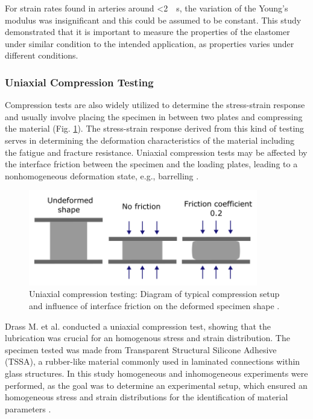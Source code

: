 For strain rates found in arteries around \SI[per-mode = symbol]{<2}{\per \second}, the variation of the
Young's modulus was insignificant and this could be assumed to be constant. This study demonstrated 
that it is important to measure the properties of the elastomer under similar condition to the
intended application, as properties varies under different conditions.

\subsubsection*{Uniaxial Compression Testing}
Compression tests are also widely utilized to determine the stress-strain response and 
usually involve placing the specimen in between two plates and compressing the material (Fig. \ref{fig:compressiondiag}).
The stress-strain response derived from this kind of testing serves in determining the deformation 
characteristics of the material including the fatigue and fracture resistance. 
Uniaxial compression tests may be affected by the interface friction between the specimen and 
the loading plates, leading to a nonhomogeneous deformation state, e.g., barrelling \cite{Bergström2015}.\\

\begin{figure}%
        \centering
       \quad
       \includegraphics[width=10cm]{Images/chapter1/compressiondiag.png}%
       \caption{Uniaxial compression testing: Diagram of typical compression setup and influence of interface friction on the deformed specimen shape \cite{Bergström2015}.}%
       \label{fig:compressiondiag}%
\end{figure}

Drass M. et al. conducted a uniaxial compression test, showing that the lubrication was 
crucial for an homogenous stress and strain distribution. The specimen tested was made from Transparent Structural 
Silicone Adhesive (TSSA), a rubber-like material commonly used in laminated connections within glass structures.
In this study homogeneous and inhomogeneous experiments were performed, as the goal was to determine an 
experimental setup, which ensured an homogeneous stress and strain distributions for the identification of material parameters \cite{Drass2018}.

